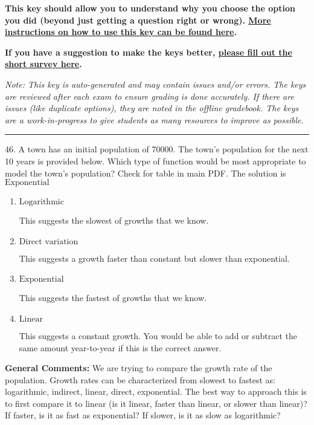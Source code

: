 \documentclass{article}[14pt]
\begin{document}
\textbf{This key should allow you to understand why you choose the option you did (beyond just getting a question right or wrong). \href{https://xronos.clas.ufl.edu/mac1105spring2020/courseDescriptionAndMisc/Exams/LearningFromResults}{More instructions on how to use this key can be found here}.}

\textbf{If you have a suggestion to make the keys better, \href{https://forms.gle/CZkbZmPbC9XALEE88}{please fill out the short survey here}.}

\textit{Note: This key is auto-generated and may contain issues and/or errors. The keys are reviewed after each exam to ensure grading is done accurately. If there are issues (like duplicate options), they are noted in the offline gradebook. The keys are a work-in-progress to give students as many resources to improve as possible.}

\rule{\textwidth}{0.4pt}

46. A town has an initial population of 70000. The town's population for the next 10 years is provided below. Which type of function would be most appropriate to model the town's population?
Check for table in main PDF. 
The solution is $ \text{Exponential} $ 

\begin{enumerate}[label=\Alph*.] 
\item $ \text{Logarithmic} $ 

 This suggests the slowest of growths that we know. 
\item $ \text{Direct variation} $ 

 This suggests a growth faster than constant but slower than exponential. 
\item $ \text{Exponential} $ 

 This suggests the fastest of growths that we know. 
\item $ \text{Linear} $ 

 This suggests a constant growth. You would be able to add or subtract the same amount year-to-year if this is the correct answer. 
\end{enumerate} 
 
\textbf{General Comments:} We are trying to compare the growth rate of the population. Growth rates can be characterized from slowest to fastest as: logarithmic, indirect, linear, direct, exponential. The best way to approach this is to first compare it to linear (is it linear, faster than linear, or slower than linear)? If faster, is it as fast as exponential? If slower, is it as slow as logarithmic?
\end{document}
